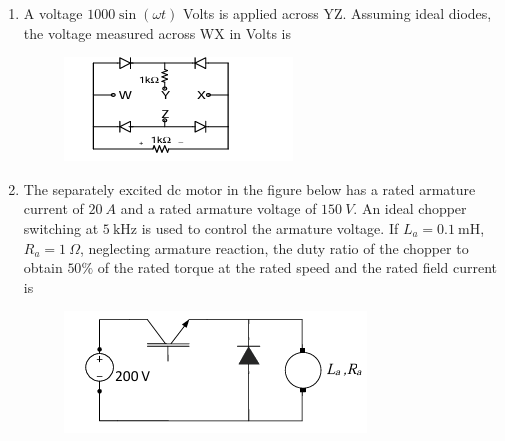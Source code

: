 \documentclass[journal,12pt,onecolumn]{IEEEtran}
\theoremstyle{remark}
\begin{document}
\begin{enumerate}
\begin{enumerate}
\end{enumerate}


\item A voltage $1000 \sin(\omega t)$ Volts is applied across YZ. Assuming ideal diodes, the voltage measured across WX in Volts is
\begin{figure}[h]
    \centering
    \includegraphics[width=0.5\columnwidth]{figs/14.png}
    \label{fig:placeholder}
\end{figure}
\begin{enumerate}
\end{enumerate}


\item The separately excited dc motor in the figure below has a rated armature current of $20~A$ and a rated armature voltage of $150~V$. An ideal chopper switching at $5~\text{kHz}$ is used to control the armature voltage. If $L_a = 0.1~\text{mH}$, $R_a = 1\ \Omega$, neglecting armature reaction, the duty ratio of the chopper to obtain $50\%$ of the rated torque at the rated speed and the rated field current is
\begin{figure}[h]
    \centering
    \includegraphics[width=0.5\columnwidth]{figs/15.png}
    \label{fig:placeholder}
\end{figure}
\begin{enumerate}
\end{enumerate}


\end{enumerate}
\end{document}
